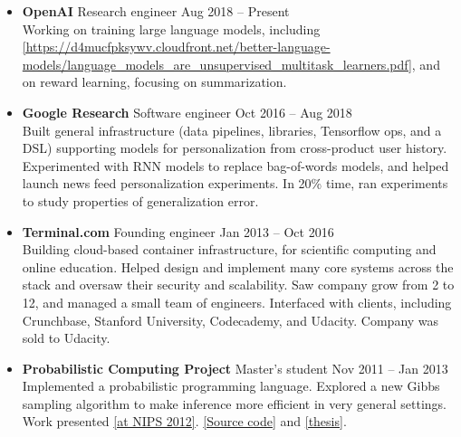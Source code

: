 \documentclass[11 pt]{article}
\begin{document}
\begin{itemize}

\item \textbf{OpenAI} Research engineer \hfill Aug 2018 -- Present \\
  Working on training large language models, including \href{GPT-2}{[https://d4mucfpksywv.cloudfront.net/better-language-models/language_models_are_unsupervised_multitask_learners.pdf]},
  and on reward learning, focusing on summarization.


\item \textbf{Google Research} Software engineer \hfill Oct 2016 -- Aug 2018 \\
Built general infrastructure (data pipelines, libraries, Tensorflow ops, and a DSL) supporting models for personalization from cross-product user history.
Experimented with RNN models to replace bag-of-words models, and helped launch news feed personalization experiments.
In 20\% time, ran experiments to study properties of generalization error.

\item \textbf{Terminal.com} Founding engineer \hfill Jan 2013 -- Oct 2016 \\
Building cloud-based container infrastructure, for scientific computing and online education.
Helped design and implement many core systems across the stack %
and oversaw their security and scalability.
Saw company grow from 2 to 12, and managed a small team of engineers.
Interfaced with clients, including Crunchbase, Stanford University, Codecademy, and Udacity.
Company was sold to Udacity.

\item \textbf{Probabilistic Computing Project} Master's student \hfill Nov 2011 -- Jan 2013 \\
Implemented a probabilistic programming language.
Explored a new Gibbs sampling algorithm to make inference more efficient in very general settings.
Work presented \href{http://probabilistic-programming.org/wiki/NIPS*2012_Workshop/Schedule#poster-wu}{[at NIPS 2012]}.
\href{https://github.com/WuTheFWasThat/PyChurch.}{[Source code]}
and
\href{https://github.com/WuTheFWasThat/PyChurch/blob/master/papers/MEng\%20thesis.pdf}{[thesis]}.



\end{itemize}
\end{document}
